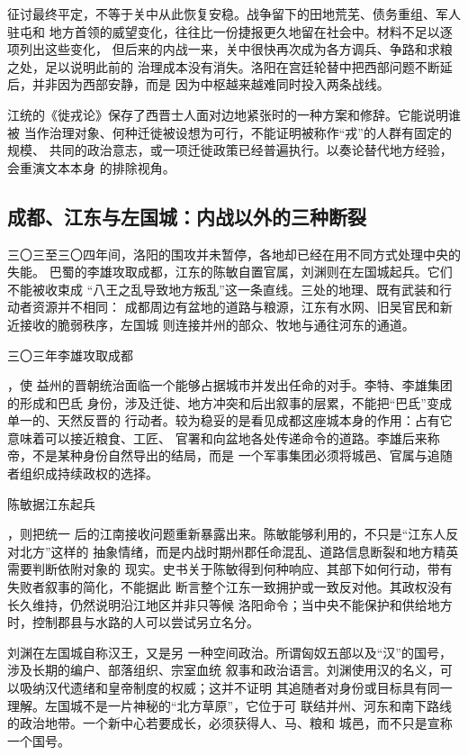 征讨最终平定，不等于关中从此恢复安稳。战争留下的田地荒芜、债务重组、军人驻屯和
地方首领的威望变化，往往比一份捷报更久地留在社会中。材料不足以逐项列出这些变化，
但后来的内战一来，关中很快再次成为各方调兵、争路和求粮之处，足以说明此前的
治理成本没有消失。洛阳在宫廷轮替中把西部问题不断延后，并非因为西部安静，而是
因为中枢越来越难同时投入两条战线。

\begin{debate}[“徙戎”不是对关中社会的统计图]
江统的《徙戎论》保存了西晋士人面对边地紧张时的一种方案和修辞。它能说明谁被
当作治理对象、何种迁徙被设想为可行，不能证明被称作“戎”的人群有固定的规模、
共同的政治意志，或一项迁徙政策已经普遍执行。以奏论替代地方经验，会重演文本本身
的排除视角。
\end{debate}

\subsection{成都、江东与左国城：内战以外的三种断裂}

三〇三至三〇四年间，洛阳的围攻并未暂停，各地却已经在用不同方式处理中央的失能。
巴蜀的李雄攻取成都，江东的陈敏自置官属，刘渊则在左国城起兵。它们不能被收束成
“八王之乱导致地方叛乱”这一条直线。三处的地理、既有武装和行动者资源并不相同：
成都周边有盆地的道路与粮源，江东有水网、旧吴官民和新近接收的脆弱秩序，左国城
则连接并州的部众、牧地与通往河东的通道。

\hypertarget{evt:JH-0303-LI-XIONG-TAKES-CHENGDU}{\textcolor{dynasty}{三〇三年李雄攻取成都}}，使
益州的晋朝统治面临一个能够占据城市并发出任命的对手。李特、李雄集团的形成和巴氐
身份，涉及迁徙、地方冲突和后出叙事的层累，不能把“巴氐”变成单一的、天然反晋的
行动者。较为稳妥的是看见成都这座城本身的作用：占有它意味着可以接近粮食、工匠、
官署和向盆地各处传递命令的道路。李雄后来称帝，不是某种身份自然导出的结局，而是
一个军事集团必须将城邑、官属与追随者组织成持续政权的选择。

\hypertarget{evt:JH-0304-CHEN-MIN-REBELLION}{\textcolor{dynasty}{陈敏据江东起兵}}，则把统一
后的江南接收问题重新暴露出来。陈敏能够利用的，不只是“江东人反对北方”这样的
抽象情绪，而是内战时期州郡任命混乱、道路信息断裂和地方精英需要判断依附对象的
现实。史书关于陈敏得到何种响应、其部下如何行动，带有失败者叙事的简化，不能据此
断言整个江东一致拥护或一致反对他。其政权没有长久维持，仍然说明沿江地区并非只等候
洛阳命令；当中央不能保护和供给地方时，控制郡县与水路的人可以尝试另立名分。

\textcolor{dynasty}{刘渊在左国城自称汉王}，又是另
一种空间政治。所谓匈奴五部以及“汉”的国号，涉及长期的编户、部落组织、宗室血统
叙事和政治语言。刘渊使用汉的名义，可以吸纳汉代遗绪和皇帝制度的权威；这并不证明
其追随者对身份或目标具有同一理解。左国城不是一片神秘的“北方草原”，它位于可
联结并州、河东和南下路线的政治地带。一个新中心若要成长，必须获得人、马、粮和
城邑，而不只是宣称一个国号。

